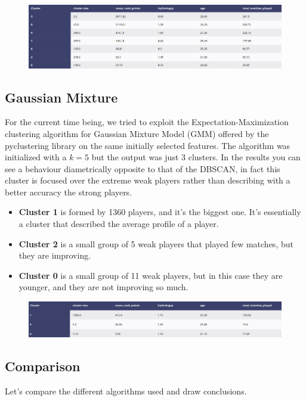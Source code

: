 \documentclass{article}
\begin{document}
\begin{figure}[h]
\centering
\includegraphics[width=.6\textwidth]{hierarchical_results}
\label{fig:hierarchical_results}
\end{figure}

\subsection{Gaussian Mixture}
For the current time being, we tried to exploit the Expectation-Maximization clustering algorithm for Gaussian Mixture Model (GMM) offered by the pyclustering library on the same initially selected features. The algorithm was initialized with a $k=5$ but the output was just $3$ clusters. In the results you can see a behaviour diametrically opposite to that of the DBSCAN, in fact this cluster is focused over the extreme weak players rather than describing with a better accuracy the strong players.  

\begin{itemize}
    \item{ \textbf{Cluster 1} is formed by 1360 players, and it's the biggest one. It's essentially a cluster that described the average profile of a player.}
    \item{ \textbf{Cluster 2} is a small group of 5 weak players that played few matches, but they are improving.}
    \item{\textbf{Cluster 0} is a small group of 11 weak players, but in this case they are younger, and they are not improving so much.}
\end{itemize}

\begin{figure}[h]
\centering
\includegraphics[width=.6\textwidth]{gm_results}
\label{fig:gm_results}
\end{figure}

\subsection{Comparison}
Let's compare the different algorithms used and draw conclusions.
\end{document}
